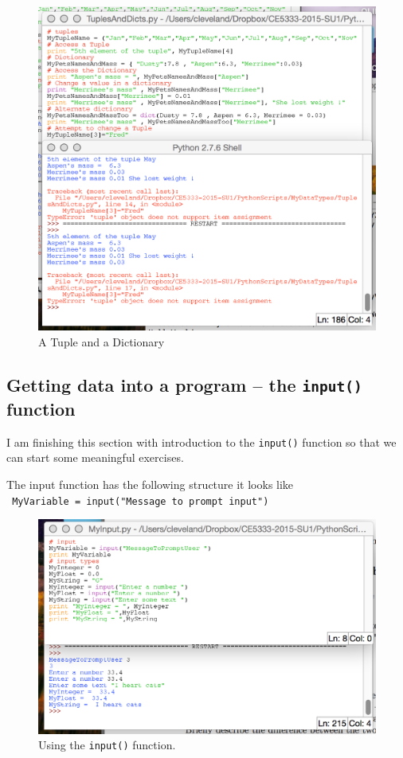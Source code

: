 \begin{figure}[h!] %
   \centering
   \includegraphics[width=5in]{./4-DataTypes/TuplesAndDicts.jpg} 
   \caption{A Tuple and a Dictionary}
   \label{fig:TuplesAndDicts}
\end{figure}
\clearpage
\subsection{Getting data into a program -- the \texttt{input()} function}
I am finishing this section with introduction to the \texttt{input()} function so that we can start some meaningful exercises.  

The input function has the following structure it looks like \\
\texttt{ MyVariable = input("Message to prompt input")}

\begin{figure}[h!] %
   \centering
   \includegraphics[width=6in]{./4-DataTypes/SimpleInputs.jpg} 
   \caption{Using the \texttt{input()} function.}
   \label{fig:SimpleInputs}
\end{figure}

